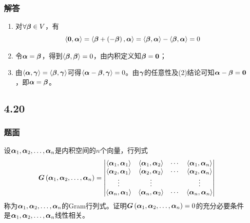 \documentclass{beamer}
\begin{document}
\begin{frame}
    \frametitle{解答}
    \begin{enumerate}
        \item {
              对\(\forall\vecbeta\in V\)，有
              \begin{equation*}
                  \indot{\veczero}{\vecal}=\indot{\vecbeta+\mypar{-\vecbeta}}{\vecal}=\indot{\vecbeta}{\vecal}-\indot{\vecbeta}{\vecal}=0
              \end{equation*}
              }\pause
        \item 令\(\vecal=\vecbeta\)，得到\(\indot{\vecbeta}{\vecbeta}=0\)，由内积定义知\(\vecbeta=\veczero\)；\pause
        \item 由\(\indot{\vecal}{\vecgamma}=\indot{\vecbeta}{\vecgamma}\)可得\(\indot{\vecal-\vecbeta}{\vecgamma}=0\)。由\(\vecgamma\)的任意性及(2)结论可知\(\vecal-\vecbeta=\veczero\)，即\(\vecal=\vecbeta\)。
    \end{enumerate}
\end{frame}

\subsection*{4.20}
\begin{frame}
    \frametitle{题面}
    设\(\enums{\vecal}{n}\)是内积空间的\(n\)个向量，行列式
    \begin{equation*}
        \gram{\enums{\vecal}{n}}=
        \begin{vmatrix}
            \indot{\vecal_1}{\vecal_1} & \indot{\vecal_1}{\vecal_2} & \cdots & \indot{\vecal_1}{\vecal_n} \\
            \indot{\vecal_2}{\vecal_1} & \indot{\vecal_2}{\vecal_2} & \cdots & \indot{\vecal_2}{\vecal_n} \\
            \vdots                     & \vdots                     &        & \vdots                     \\
            \indot{\vecal_n}{\vecal_1} & \indot{\vecal_n}{\vecal_2} & \cdots & \indot{\vecal_n}{\vecal_n}
        \end{vmatrix}
    \end{equation*}
    称为\(\enums{\vecal}{n}\)的Gram行列式。证明\(\gram{\enums{\vecal}{n}}=0\)的充分必要条件是\(\enums{\vecal}{n}\)线性相关。
\end{frame}
\end{document}
